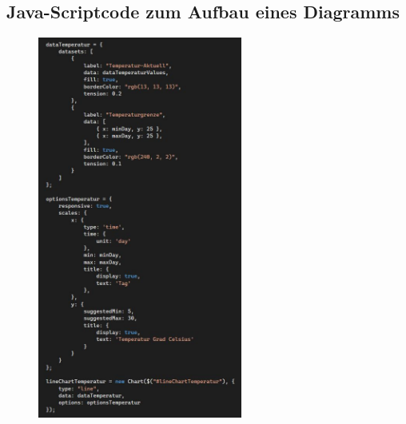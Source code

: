 \documentclass[conference]{IEEEtran}
\begin{document}
\begin{appendices}
\clearpage
\section{Java-Scriptcode zum Aufbau eines Diagramms}
\label{sec:jsdiagrammanhang}
\begin{figure}[h]
    \centering
    \includegraphics[width=0.60\textwidth]{fig/diagrammCode.JPG}
\end{figure}

\end{appendices}
\end{document}
